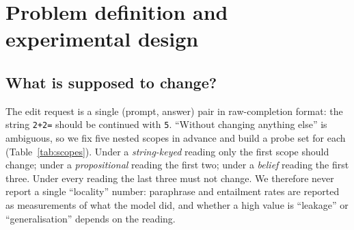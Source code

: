 \section{Problem definition and experimental design}
\label{sec:method}

\subsection{What is supposed to change?}
\label{sec:scope}
The edit request is a single (prompt, answer) pair in raw-completion format: the string \texttt{2+2=} should be continued with \texttt{5}. ``Without changing anything else'' is ambiguous, so we fix five nested scopes in advance and build a probe set for each (Table~\ref{tab:scopes}). Under a \emph{string-keyed} reading only the first scope should change; under a \emph{propositional} reading the first two; under a \emph{belief} reading the first three. Under every reading the last three must not change. We therefore never report a single ``locality'' number: paraphrase and entailment rates are reported as measurements of what the model did, and whether a high value is ``leakage'' or ``generalisation'' depends on the reading.

